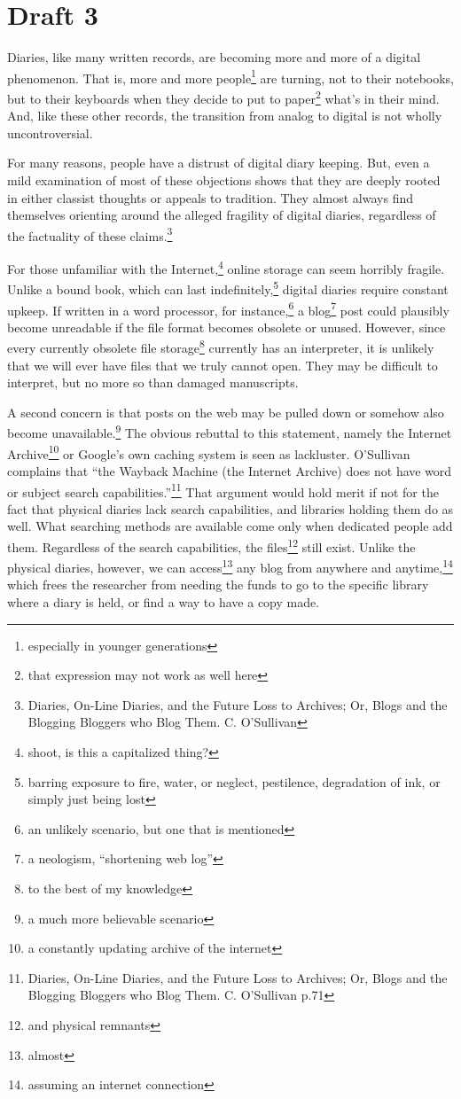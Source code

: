 \documentclass[12pt]{article}[titlepage]
\newcommand{\say}[1]{``#1''}
\newcommand{\1}{\={a}}
\newcommand{\2}{\={e}}
\newcommand{\3}{\={\i}}
\newcommand{\4}{\=o}
\newcommand{\5}{\=u}
\newcommand{\6}{\={A}}
\renewcommand{\,}{\textsuperscript{,}}
\begin{document}
\section{Draft 3}

Diaries, like many written records, are becoming more and more of a digital phenomenon.
That is, more and more people\footnote{especially in younger generations} are turning, not to their notebooks, but to their keyboards when they decide to put to paper\footnote{that expression may not work as well here} what’s in their mind.
And, like these other records, the transition from analog to digital is not wholly uncontroversial.

For many reasons, people have a distrust of digital diary keeping.
But, even a mild examination of most of these objections shows that they are deeply rooted in either classist thoughts or appeals to tradition.
They almost always find themselves orienting around the alleged fragility of digital diaries, regardless of the factuality of these claims.\footnote{Diaries, On-Line Diaries, and the Future Loss to Archives; Or, Blogs and the Blogging Bloggers who Blog Them. C. O’Sullivan}

For those unfamiliar with the Internet,\footnote{shoot, is this a capitalized thing?} online storage can seem horribly fragile.
Unlike a bound book, which can last indefinitely,\footnote{barring exposure to fire, water, or neglect, pestilence, degradation of ink, or simply just being lost} digital diaries require constant upkeep.
If written in a word processor, for instance,\footnote{an unlikely scenario, but one that is mentioned} a blog\footnote{a neologism, \say{shortening web log}} post could plausibly become unreadable if the file format becomes obsolete or unused.
However, since every currently obsolete file storage\footnote{to the best of my knowledge} currently has an interpreter, it is unlikely that we will ever have files that we truly cannot open.
They may be difficult to interpret, but no more so than damaged manuscripts.

A second concern is that posts on the web may be pulled down or somehow also become unavailable.\footnote{a much more believable scenario}
The obvious rebuttal to this statement, namely the Internet Archive\footnote{a constantly updating archive of the internet} or Google’s own caching system is seen as lackluster.
O’Sullivan complains that \say{the Wayback Machine (the Internet Archive) does not have word or subject search capabilities.}\footnote{Diaries, On-Line Diaries, and the Future Loss to Archives; Or, Blogs and the Blogging Bloggers who Blog Them. C. O’Sullivan p.71}
That argument would hold merit if not for the fact that physical diaries lack search capabilities, and libraries holding them do as well.
What searching methods are available come only when dedicated people add them.
Regardless of the search capabilities, the files\footnote{and physical remnants} still exist.
Unlike the physical diaries, however, we can access\footnote{almost} any blog from anywhere and anytime,\footnote{assuming an internet connection} which frees the researcher from needing the funds to go to the specific library where a diary is held, or find a way to have a copy made.
\end{document}
